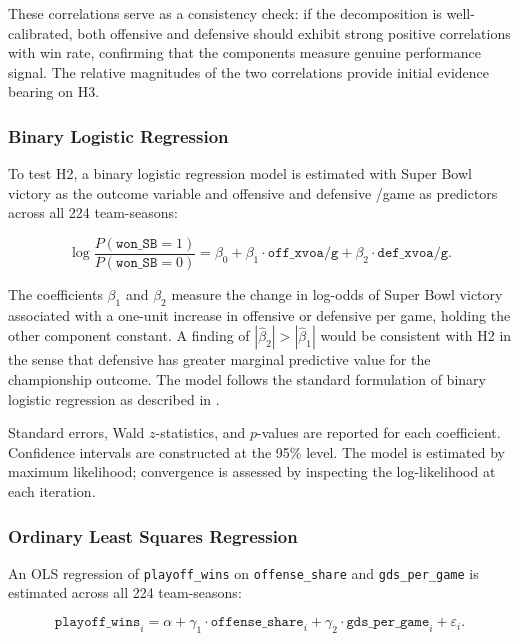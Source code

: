 These correlations serve as a consistency check: if the \gds{} decomposition
is well-calibrated, both offensive and defensive \xvoa{} should exhibit strong
positive correlations with win rate, confirming that the components measure
genuine performance signal. The relative magnitudes of the two correlations
provide initial evidence bearing on H3.

\subsubsection{Binary Logistic Regression}
\label{sec:logistic}

To test H2, a binary logistic regression model is estimated with
Super Bowl victory as the outcome variable and offensive and defensive
\xvoa{}/game as predictors across all 224 team-seasons:

\begin{equation}
  \label{eq:logistic}
  \log \frac{P(\texttt{won\_SB} = 1)}{P(\texttt{won\_SB} = 0)}
  = \beta_0
    + \beta_1 \cdot \texttt{off\_xvoa/g}
    + \beta_2 \cdot \texttt{def\_xvoa/g}.
\end{equation}

The coefficients $\beta_1$ and $\beta_2$ measure the change in log-odds of
Super Bowl victory associated with a one-unit increase in offensive or
defensive \xvoa{} per game, holding the other component constant. A finding
of $|\hat{\beta}_2| > |\hat{\beta}_1|$ would be consistent with H2 in the
sense that defensive \xvoa{} has greater marginal predictive value for the
championship outcome. The model follows the standard formulation of binary
logistic regression as described in \textcite{hosmer2013logistic}.

Standard errors, Wald $z$-statistics, and $p$-values are reported for each
coefficient. Confidence intervals are constructed at the 95\% level. The
model is estimated by maximum likelihood; convergence is assessed by
inspecting the log-likelihood at each iteration.

\subsubsection{Ordinary Least Squares Regression}

An OLS regression of \texttt{playoff\_wins} on \texttt{offense\_share} and
\texttt{gds\_per\_game} is estimated across all 224 team-seasons:

\begin{equation}
  \label{eq:ols}
  \texttt{playoff\_wins}_i
  = \alpha
    + \gamma_1 \cdot \texttt{offense\_share}_i
    + \gamma_2 \cdot \texttt{gds\_per\_game}_i
    + \varepsilon_i.
\end{equation}

